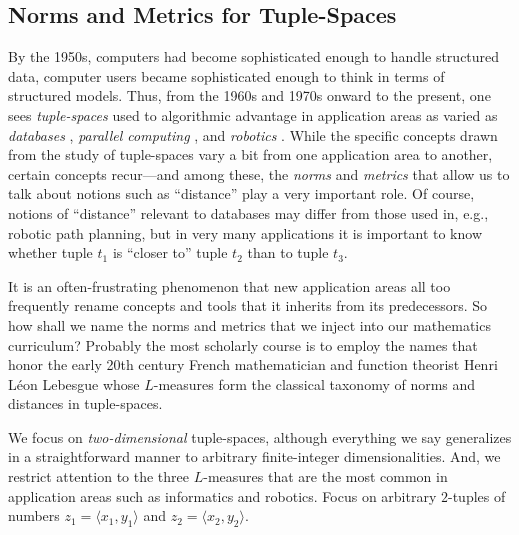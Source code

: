 \subsection{Norms and Metrics for Tuple-Spaces}
\label{sec:Ln-norms}


By the 1950s, computers had become sophisticated enough to handle structured data, computer users became sophisticated enough to think in terms of structured models.  Thus, from the 1960s and 1970s onward to the present, one sees {\it tuple-spaces} used to algorithmic advantage in application areas as varied as {\it databases} \cite{Codd70}, {\it parallel computing} \cite{BlumS77,Shinahr74}, and {\it robotics} \cite{Marchese96,Rosenberg12}.  While the specific concepts drawn from the study of tuple-spaces vary a bit from one application area to another, certain concepts recur---and among these, the {\it norms} and {\it metrics} that allow us to talk about notions such as ``distance'' play a very important role.  Of course, notions of ``distance''
relevant to databases may differ from those used in, e.g., robotic path planning, but in very many applications it is important to know whether tuple $t_1$ is ``closer to'' tuple $t_2$ than to tuple $t_3$.

\smallskip

 

It is an often-frustrating phenomenon that new application areas all too frequently rename concepts and tools that it inherits from its predecessors.  So how shall we name the norms and metrics that we inject into our mathematics curriculum?  Probably the most scholarly course is to employ the names that honor the early 20th century French mathematician and function theorist Henri L\'{e}on Lebesgue whose $L$-measures form the classical taxonomy of norms and distances in tuple-spaces.

We focus on {\em two-dimensional} tuple-spaces, although everything we say generalizes in a straightforward manner to arbitrary finite-integer dimensionalities.  And, we restrict attention to the three $L$-measures that are the most common in application areas such as informatics and robotics.  Focus on arbitrary $2$-tuples of numbers $z_1 = \langle x_1, y_1 \rangle$ and $z_2 = \langle x_2, y_2 \rangle$.

\medskip

  
  

